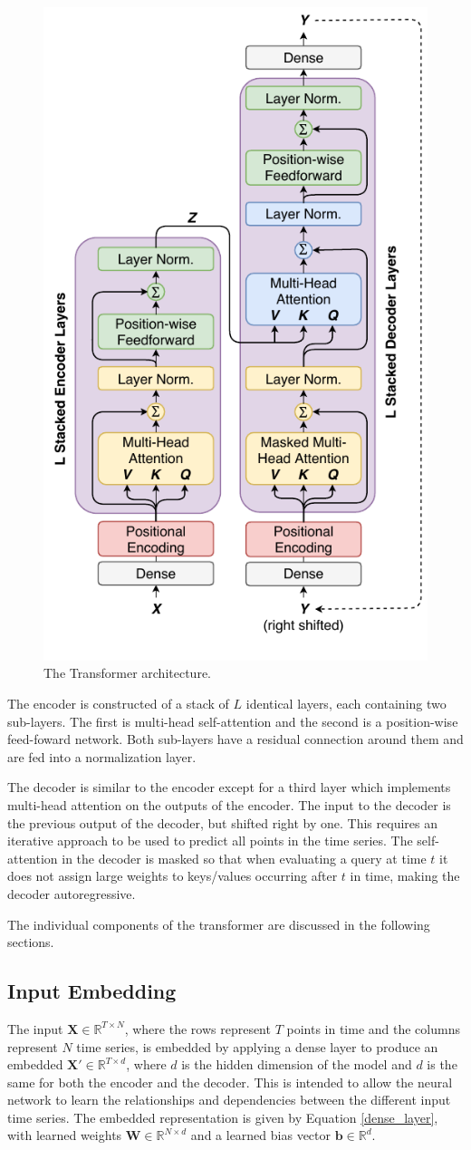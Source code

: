 \begin{figure}[htbp]
	\centerline{\includegraphics[trim=0 0.8cm 0 0, width=.35\textwidth]{images/transformer.pdf}}
	\caption{The Transformer architecture.}
	\label{fig:transformer}
\end{figure}

The encoder is constructed of a stack of $L$ identical layers, each containing two sub-layers.
The first is multi-head self-attention and the second is a position-wise feed-foward network.
Both sub-layers have a residual connection around them and are fed into a normalization layer.

The decoder is similar to the encoder except for a third layer which implements multi-head attention on the outputs of the encoder.
The input to the decoder is the previous output of the decoder, but shifted right by one.
This requires an iterative approach to be used to predict all points in the time series.
The self-attention in the decoder is masked so that when evaluating a query at time $t$ it does not assign large weights to keys/values occurring after $t$ in time, making the decoder autoregressive.

The individual components of the transformer are discussed in the following sections.

\subsection{Input Embedding}
The input $\boldsymbol{X} \in \mathbb{R}^{T \times N}$, where the rows represent $T$ points in time and the columns represent $N$ time series, is embedded by applying a dense layer to produce an embedded $\boldsymbol{X'} \in \mathbb{R}^{T \times d}$, where $d$ is the hidden dimension of the model and $d$ is the same for both the encoder and the decoder.
This is intended to allow the neural network to learn the relationships and dependencies between the different input time series.
The embedded representation is given by Equation \ref{dense_layer}, with learned weights $\boldsymbol{W} \in \mathbb{R}^{N \times d}$ and a learned bias vector $\boldsymbol{b} \in \mathbb{R}^{d}$.

